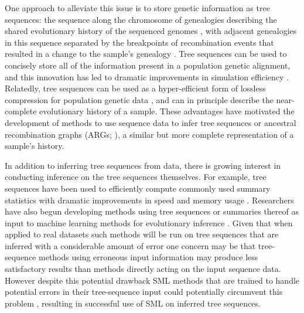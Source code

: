 One approach to alleviate this issue is to store genetic information as tree sequences: the sequence along the chromosome of genealogies describing the shared evolutionary history of the sequenced genomes \cite{kelleherEfficientCoalescentSimulation2016}, with adjacent genealogies in this sequence separated by the breakpoints of recombination events that resulted in a change to the sample's genealogy \cite{wiufRecombinationPointProcess1999}. Tree sequences can be used to concisely store all of the information present in a population genetic alignment, and this innovation has led to dramatic improvements in simulation efficiency \cite{hallerSLiMMultispeciesEcoEvolutionary2022,kelleherEfficientPedigreeRecording2018}. Relatedly, tree sequences can be used as a hyper-efficient form of lossless compression for population genetic data \cite{kelleherInferringWholegenomeHistories2019}, and can in principle describe the near-complete evolutionary history of a sample. These advantages have motivated the development of methods to use sequence data to infer tree sequences \cite{kelleherInferringWholegenomeHistories2019,speidelMethodGenomewideGenealogy2019a,zhangBiobankscaleInferenceAncestral2023a} or ancestral recombination graphs (ARGs; \cite{mahmoudiBayesianInferenceAncestral2022,rasmussenGenomeWideInferenceAncestral2014}), a similar but more complete representation of a sample's history. 

In addition to inferring tree sequences from data, there is growing interest in conducting inference on the tree sequences themselves. For example, tree sequences have been used to efficiently compute commonly used summary statistics with dramatic improvements in speed and memory usage \cite{ralphEfficientlySummarizingRelationships2020}. Researchers have also begun developing methods using tree sequences or summaries thereof as input to machine learning methods for evolutionary inference \cite{hejaseDeepLearningApproachInference2022,korfmannSimultaneousInferenceDemography2023,pearsonLocalAncestryInference2023}. Given that when applied to real datasets such methods will be run on tree sequences that are inferred with a considerable amount of error \cite{zhangBiobankscaleInferenceAncestral2023a} one concern may be that tree-sequence methods using erroneous input information may produce less satisfactory results than methods directly acting on the input sequence data. However despite this potential drawback SML methods that are trained to handle potential errors in their tree-sequence input could potentially circumvent this problem \cite{moDomainadaptiveNeuralNetworks2023a}, resulting in successful use of SML on inferred tree sequences.

